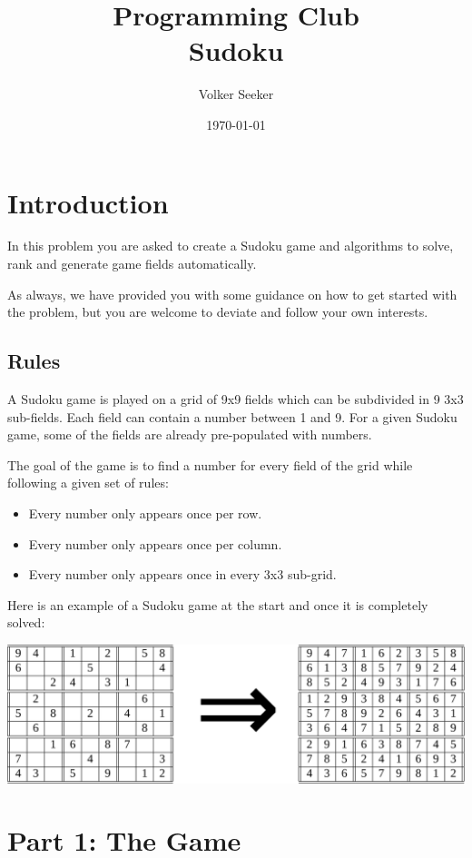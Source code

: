 \documentclass{article}
\title{
    \textbf{Programming Club}\\
    Sudoku \\
}
\author{Volker Seeker}
\date{\today}
\begin{document}
    \maketitle

\setlength{\parskip}{1em}
\setlength{\parindent}{0em}

    \section{Introduction}
    In this problem you are asked to create a Sudoku game and algorithms
    to solve, rank and generate game fields automatically.

    As always, we have provided you with some guidance on how to get started
    with the problem, but you are welcome to deviate and follow your own interests.

    \subsection{Rules}
    A Sudoku game is played on a grid of 9x9 fields which can be subdivided in 9 3x3
    sub-fields. Each field can contain a number between 1 and 9. For a given Sudoku
    game, some of the fields are already pre-populated with numbers.

    The goal of the game is to find a number for every field of the grid while following
    a given set of rules:

    \begin{itemize}
        \item Every number only appears once per row.
        \item Every number only appears once per column.
        \item Every number only appears once in every 3x3 sub-grid.
    \end{itemize}

    Here is an example of a Sudoku game at the start and once it is completely solved:

    \includegraphics[width=1\textwidth]{game_example}


    \section{Part 1: The Game}
\end{document}
